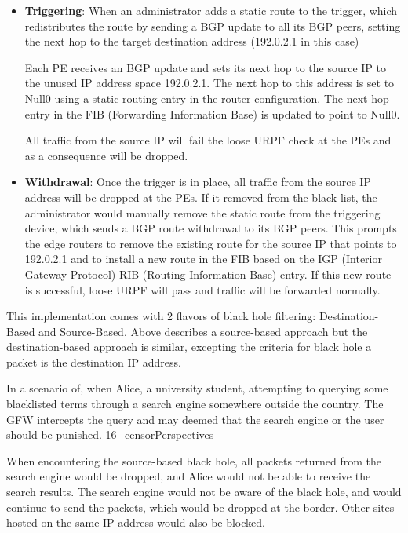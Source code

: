 \documentclass[sigconf]{acmart}
\begin{document}
\begin{itemize}
\item
  \textbf{Triggering}: When an administrator adds a static route to the
  trigger, which redistributes the route by sending a BGP update to all
  its BGP peers, setting the next hop to the target destination address
  (192.0.2.1 in this case)

  Each PE receives an BGP update and sets its next hop to the source IP
  to the unused IP address space 192.0.2.1. The next hop to this address
  is set to Null0 using a static routing entry in the router
  configuration. The next hop entry in the FIB (Forwarding Information
  Base) is updated to point to Null0.

  All traffic from the source IP will fail the loose URPF check at the
  PEs and as a consequence will be dropped.
\item
  \textbf{Withdrawal}: Once the trigger is in place, all traffic from
  the source IP address will be dropped at the PEs. If it removed from
  the black list, the administrator would manually remove the static
  route from the triggering device, which sends a BGP route withdrawal
  to its BGP peers. This prompts the edge routers to remove the existing
  route for the source IP that points to 192.0.2.1 and to install a new
  route in the FIB based on the IGP (Interior Gateway Protocol) RIB
  (Routing Information Base) entry. If this new route is successful,
  loose URPF will pass and traffic will be forwarded normally.
\end{itemize}

This implementation comes with 2 flavors of black hole filtering:
Destination-Based and Source-Based. Above describes a source-based
approach but the destination-based approach is similar, excepting the
criteria for black hole a packet is the destination IP address.

In a scenario of, when Alice, a university student, attempting to
querying some blacklisted terms through a search engine somewhere
outside the country. The GFW intercepts the query and may deemed that
the search engine or the user should be punished. 16\_censorPerspectives

When encountering the source-based black hole, all packets returned from
the search engine would be dropped, and Alice would not be able to
receive the search results. The search engine would not be aware of the
black hole, and would continue to send the packets, which would be
dropped at the border. Other sites hosted on the same IP address would
also be blocked.
\end{document}
